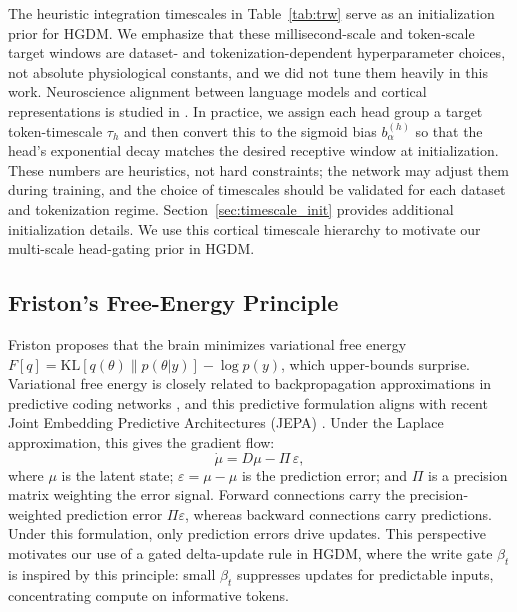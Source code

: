 \documentclass{article}
\newcommand{\eps}{\varepsilon}
\begin{document}
The heuristic integration timescales in Table~\ref{tab:trw} serve as an initialization prior for HGDM. We emphasize that these millisecond-scale and token-scale target windows are dataset- and tokenization-dependent hyperparameter choices, not absolute physiological constants, and we did not tune them heavily in this work. Neuroscience alignment
between language models and cortical representations is studied
in \cite{schrimpf2021neural,goldstein2022parallel}. In practice, we assign each
head group a target token-timescale $\tau_h$ and then convert this to the
sigmoid bias $b_\alpha^{(h)}$ so that the head's exponential decay matches
the desired receptive window at initialization. These numbers are heuristics,
not hard constraints; the network may adjust them during training, and the
choice of timescales should be validated for each dataset and tokenization
regime. Section~\ref{sec:timescale_init} provides additional initialization details. We use this cortical timescale hierarchy to motivate our multi-scale head-gating prior in HGDM.

\subsection{Friston's Free-Energy Principle}

Friston \cite{friston2010fep,isomura2023invitro} proposes that the brain minimizes variational
free energy $F[q] = \mathrm{KL}[q(\theta)\|p(\theta|y)] - \log p(y)$, which
upper-bounds surprise. Variational free energy is closely related to backpropagation approximations in predictive coding networks \cite{whittington2017predictive,boutin2021sdpc}, and this predictive formulation aligns with recent Joint Embedding Predictive Architectures (JEPA) \cite{lecun2022jepa,huang2025llmjepa}. Under the Laplace approximation, this gives the gradient
flow:
\begin{equation}
  \dot{\mu} = D\mu - \Pi\,\eps,
  \label{eq:friston}
\end{equation}
where $\mu$ is the latent state; $\eps = \mu - \hat{\mu}$ is the
prediction error; and $\Pi$ is a precision matrix weighting the error signal. Forward connections carry the precision-weighted prediction error $\Pi\eps$, whereas backward connections carry predictions. Under this formulation, only prediction errors drive updates. This perspective motivates our use of a gated delta-update rule in HGDM, where the write gate $\beta_t$ is inspired by this principle: small $\beta_t$ suppresses updates for predictable inputs, concentrating compute on informative tokens.
\end{document}
